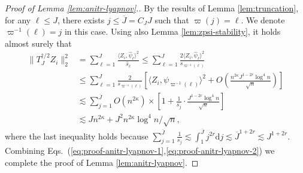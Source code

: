 \documentclass[aos]{imsart}
\renewcommand{\hat}{\widehat}
\renewcommand{\bar}{\overline}
\newcommand{\ud}{\mathrm d}
\theoremstyle{plain}
\theoremstyle{definition}
\theoremstyle{definition}
\begin{document}
\begin{appendix}
\begin{proof}[Proof of Lemma \ref{lem:anitr-lyapnov}.]
By the results of Lemma \ref{lem:truncation}, for any $\ell\leq J$, there exists $j\leq \bar J=C_J J$ such that $\varpi(j)=\ell$. We denote $\varpi^{-1}(\ell)=j$ in this case. 
Using also Lemma \ref{lem:zpsi-stability}, it holds almost surely that
\begin{align}
\|T_J^{\dagger/2}Z_i\|_2^2  &= \sum_{\ell=1}^J\frac{\langle Z_i,\hat\psi_\ell\rangle^2}{\hat s_\ell}
\leq \sum_{\ell=1}^J\frac{2\langle Z_i,\hat\psi_\ell\rangle^2}{s_{\varpi^{-1}(\ell)}}\nonumber\\
&\leq \sum_{\ell=1}^J \frac{2}{s_{\varpi^{-1}(\ell)}}\left[\langle Z_i,\psi_{\varpi^{-1}(\ell)}\rangle^2 + O\left(\frac{n^{2\kappa}J^{1-2r}\log^4 n}{\sqrt{n}}\right)\right]\nonumber\\
&\lesssim \sum_{j=1}^{\bar J}O(n^{2\kappa})\times\left[1 + \frac{1}{s_j}\cdot \frac{J^{1-2r}\log^4 n}{\sqrt{n}}\right]\nonumber\\
&\lesssim Jn^{2\kappa} + J^2 n^{2\kappa}\log^4 n/\sqrt{n},\label{eq:proof-anitr-lyapnov-2}
\end{align}
where the last inequality holds because $\sum_{j=1}^{\bar J} {\frac{1}{s_j}} \lesssim \int_1^{\bar J}j^{2r}\ud j \lesssim \bar J^{1+2r}\lesssim J^{1+2r}$.
Combining Eqs.~(\ref{eq:proof-anitr-lyapnov-1},\ref{eq:proof-anitr-lyapnov-2}) we complete the proof of Lemma \ref{lem:anitr-lyapnov}.

\end{proof}
\end{appendix}
\end{document}
